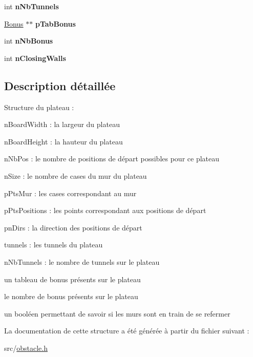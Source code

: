 \begin{DoxyCompactItemize}
\item 
\hypertarget{struct_board_a9abff377be739110b0e7fe6708cb0bbf}{int {\bfseries n\-Nb\-Tunnels}}\label{struct_board_a9abff377be739110b0e7fe6708cb0bbf}

\item 
\hypertarget{struct_board_abb264e7d7facdd7742de5d13482d72e3}{\hyperlink{struct_bonus}{Bonus} $\ast$$\ast$ {\bfseries p\-Tab\-Bonus}}\label{struct_board_abb264e7d7facdd7742de5d13482d72e3}

\item 
\hypertarget{struct_board_a8ac28cdfb3bb7a7409393a3e62d83897}{int {\bfseries n\-Nb\-Bonus}}\label{struct_board_a8ac28cdfb3bb7a7409393a3e62d83897}

\item 
\hypertarget{struct_board_a1764ac18036257cb14e9c92f0c6ded1d}{int {\bfseries n\-Closing\-Walls}}\label{struct_board_a1764ac18036257cb14e9c92f0c6ded1d}

\end{DoxyCompactItemize}


\subsection{Description détaillée}
Structure du plateau \-:
\begin{DoxyItemize}
\item n\-Board\-Width \-: la largeur du plateau
\item n\-Board\-Height \-: la hauteur du plateau
\item n\-Nb\-Pos \-: le nombre de positions de départ possibles pour ce plateau
\item n\-Size \-: le nombre de cases du mur du plateau
\item p\-Pts\-Mur \-: les cases correspondant au mur
\item p\-Pts\-Positions \-: les points correspondant aux positions de départ
\item pn\-Dirs \-: la direction des positions de départ
\item tunnels \-: les tunnels du plateau
\item n\-Nb\-Tunnels \-: le nombre de tunnels sur le plateau
\item un tableau de bonus présents sur le plateau
\item le nombre de bonus présents sur le plateau
\item un booléen permettant de savoir si les murs sont en train de se refermer 
\end{DoxyItemize}

La documentation de cette structure a été générée à partir du fichier suivant \-:\begin{DoxyCompactItemize}
\item 
src/\hyperlink{obstacle_8h}{obstacle.\-h}\end{DoxyCompactItemize}
